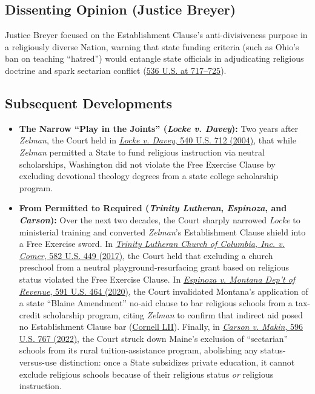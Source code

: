 \documentclass[12pt]{article}
\begin{document}
\subsection{Dissenting Opinion (Justice Breyer)}

Justice Breyer focused on the Establishment Clause's anti-divisiveness purpose in a religiously diverse Nation, warning that state funding criteria (such as Ohio's ban on teaching ``hatred'') would entangle state officials in adjudicating religious doctrine and spark sectarian conflict (\href{https://supreme.justia.com/cases/federal/us/536/639/}{536 U.S. at 717--725}).

\subsection{Subsequent Developments}

\begin{itemize}
  \item \textbf{The Narrow ``Play in the Joints'' (\emph{Locke v. Davey}):} Two years after \emph{Zelman}, the Court held in \href{https://supreme.justia.com/cases/federal/us/540/712/}{\emph{Locke v. Davey}, 540 U.S. 712 (2004)}, that while \emph{Zelman} permitted a State to fund religious instruction via neutral scholarships, Washington did not violate the Free Exercise Clause by excluding devotional theology degrees from a state college scholarship program.
  \item \textbf{From Permitted to Required (\emph{Trinity Lutheran}, \emph{Espinoza}, and \emph{Carson}):} Over the next two decades, the Court sharply narrowed \emph{Locke} to ministerial training and converted \emph{Zelman}'s Establishment Clause shield into a Free Exercise sword. In \href{https://supreme.justia.com/cases/federal/us/582/15-577/}{\emph{Trinity Lutheran Church of Columbia, Inc. v. Comer}, 582 U.S. 449 (2017)}, the Court held that excluding a church preschool from a neutral playground-resurfacing grant based on religious status violated the Free Exercise Clause. In \href{https://supreme.justia.com/cases/federal/us/591/18-1195/}{\emph{Espinoza v. Montana Dep't of Revenue}, 591 U.S. 464 (2020)}, the Court invalidated Montana's application of a state ``Blaine Amendment'' no-aid clause to bar religious schools from a tax-credit scholarship program, citing \emph{Zelman} to confirm that indirect aid posed no Establishment Clause bar (\href{https://www.law.cornell.edu/constitution-conan/amendment-1/zelman-and-indirect-aid}{Cornell LII}). Finally, in \href{https://supreme.justia.com/cases/federal/us/596/20-1088/}{\emph{Carson v. Makin}, 596 U.S. 767 (2022)}, the Court struck down Maine's exclusion of ``sectarian'' schools from its rural tuition-assistance program, abolishing any status-versus-use distinction: once a State subsidizes private education, it cannot exclude religious schools because of their religious status \emph{or} religious instruction.

\end{itemize}
\end{document}
